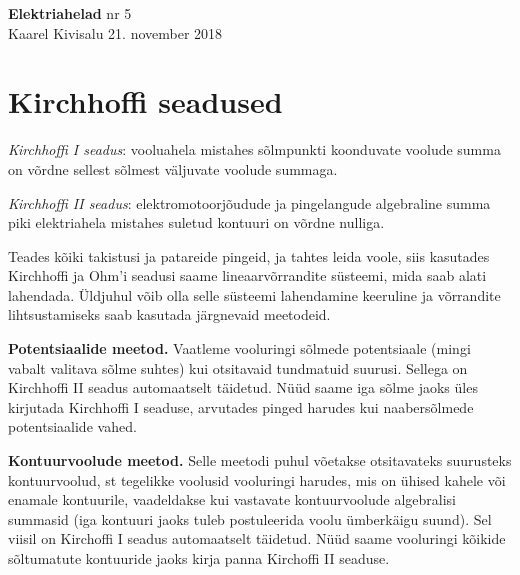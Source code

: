\documentclass[a4paper,11pt,twocolumn]{article}
\begin{document}
{\huge \textbf{Elektriahelad} \hfill \normalsize {nr 5}} \\
{Kaarel Kivisalu \hfill 21. november 2018}

%

\section{Kirchhoffi seadused}
\textit{Kirchhoffi I seadus}: vooluahela mistahes sõlmpunkti koonduvate voolude summa on võrdne sellest sõlmest väljuvate voolude summaga.

\textit{Kirchhoffi II seadus}: elektromotoorjõudude ja pingelangude algebraline summa piki elektriahela mistahes suletud kontuuri on võrdne nulliga.

Teades kõiki takistusi ja patareide pingeid, ja tahtes leida voole, siis kasutades Kirchhoffi ja Ohm'i seadusi saame lineaarvõrrandite süsteemi, mida saab alati lahendada. Üldjuhul võib olla selle süsteemi lahendamine keeruline ja võrrandite lihtsustamiseks saab kasutada järgnevaid meetodeid.

\textbf{Potentsiaalide meetod.} Vaatleme vooluringi sõlmede potentsiaale (mingi vabalt valitava sõlme suhtes) kui otsitavaid tundmatuid suurusi. Sellega on Kirchhoffi II seadus automaatselt täidetud. Nüüd saame iga sõlme jaoks üles kirjutada Kirchhoffi I seaduse, arvutades pinged harudes kui naabersõlmede potentsiaalide vahed.

\textbf{Kontuurvoolude meetod.} Selle meetodi puhul võetakse otsitavateks suurusteks kontuurvoolud, st tegelikke voolusid vooluringi harudes, mis on ühised kahele või enamale kontuurile, vaadeldakse kui vastavate kontuurvoolude algebralisi summasid (iga kontuuri jaoks tuleb postuleerida voolu ümberkäigu suund). Sel viisil on Kirchoffi I seadus automaatselt täidetud. Nüüd saame vooluringi kõikide sõltumatute kontuuride jaoks kirja panna Kirchoffi II seaduse.
\end{document}
